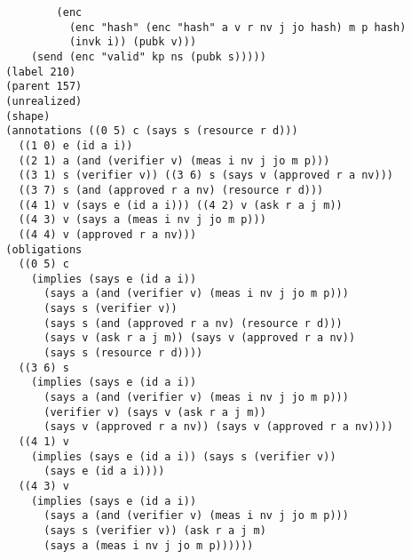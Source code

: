 \documentclass[titlepage,12pt]{article}
\theoremstyle{definition}
\begin{document}
\begin{verbatim}
          (enc
            (enc "hash" (enc "hash" a v r nv j jo hash) m p hash)
            (invk i)) (pubk v)))
      (send (enc "valid" kp ns (pubk s)))))
  (label 210)
  (parent 157)
  (unrealized)
  (shape)
  (annotations ((0 5) c (says s (resource r d)))
    ((1 0) e (id a i))
    ((2 1) a (and (verifier v) (meas i nv j jo m p)))
    ((3 1) s (verifier v)) ((3 6) s (says v (approved r a nv)))
    ((3 7) s (and (approved r a nv) (resource r d)))
    ((4 1) v (says e (id a i))) ((4 2) v (ask r a j m))
    ((4 3) v (says a (meas i nv j jo m p)))
    ((4 4) v (approved r a nv)))
  (obligations
    ((0 5) c
      (implies (says e (id a i))
        (says a (and (verifier v) (meas i nv j jo m p)))
        (says s (verifier v))
        (says s (and (approved r a nv) (resource r d)))
        (says v (ask r a j m)) (says v (approved r a nv))
        (says s (resource r d))))
    ((3 6) s
      (implies (says e (id a i))
        (says a (and (verifier v) (meas i nv j jo m p)))
        (verifier v) (says v (ask r a j m))
        (says v (approved r a nv)) (says v (approved r a nv))))
    ((4 1) v
      (implies (says e (id a i)) (says s (verifier v))
        (says e (id a i))))
    ((4 3) v
      (implies (says e (id a i))
        (says a (and (verifier v) (meas i nv j jo m p)))
        (says s (verifier v)) (ask r a j m)
        (says a (meas i nv j jo m p))))))
\end{verbatim}
\endgroup
\fi

\iffalse
$$\xymatrix{
\txt{\strut attester}&\txt{\strut client}&\txt{\strut server}&\txt{\strut verifier}&\txt{\strut epca}\\
&\bullet\ar@{=>}[dddd]\ar[r]&\bullet\ar@{=>}[d]&&\\
&&\bullet\ar@{=>}[dd]\ar[r]&\bullet\ar@{=>}[d]&\\
&&&\bullet\ar@{=>}[d]&\bullet\ar[l]\\
&&\bullet\ar@{=>}[d]&\bullet\ar@{=>}[ddddd]\ar[l]&\\
&\bullet\ar@{=>}[d]&\bullet\ar@{=>}[ddd]\ar[l]&&\\
\bullet\ar@{=>}[d]&\bullet\ar@{=>}[d]\ar[l]&&&\\
\bullet\ar[r]&\bullet\ar@{=>}[d]&&&\\
&\bullet\ar@{=>}[ddd]\ar[r]&\bullet\ar@{=>}[d]&&\\
&&\bullet\ar@{=>}[d]\ar[r]&\bullet\ar@{=>}[d]&\\
&&\bullet\ar@{=>}[d]&\bullet\ar[l]&\\
&\bullet&\bullet\ar[l]&&}$$
\fi
\end{document}
